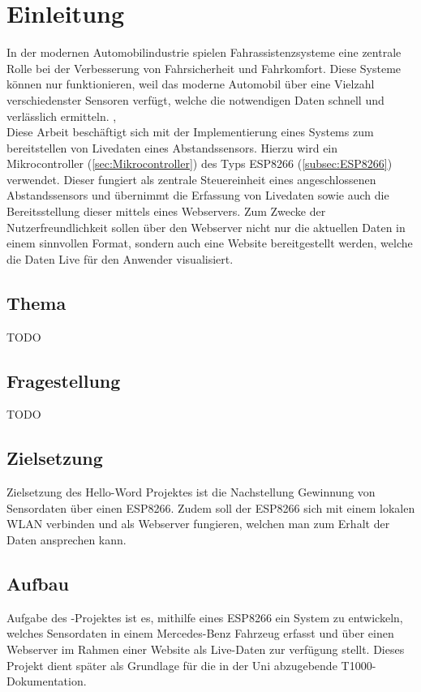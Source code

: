 
\chapter{Einleitung}
In der modernen Automobilindustrie spielen Fahrassistenzsysteme eine zentrale Rolle bei der Verbesserung von Fahrsicherheit und Fahrkomfort. Diese Systeme können nur funktionieren, weil das moderne Automobil über eine Vielzahl verschiedenster Sensoren verfügt, welche die notwendigen Daten schnell und verlässlich ermitteln. \protect{}, \protect{}\\
Diese Arbeit beschäftigt sich mit der Implementierung eines Systems zum bereitstellen von Livedaten eines Abstandssensors. Hierzu wird ein Mikrocontroller (\autoref{sec:Mikrocontroller}) des Typs ESP8266 (\autoref{subsec:ESP8266}) verwendet. Dieser fungiert als zentrale Steuereinheit eines angeschlossenen Abstandssensors und übernimmt die Erfassung von Livedaten sowie auch die Bereitsstellung dieser mittels eines Webservers. Zum Zwecke der Nutzerfreundlichkeit sollen über den Webserver nicht nur die aktuellen Daten in einem sinnvollen Format, sondern auch eine Website bereitgestellt werden, welche die Daten Live für den Anwender visualisiert.  

\section{Thema}
TODO

\section{Fragestellung}
TODO

\section{Zielsetzung}
Zielsetzung des Hello-Word Projektes ist die Nachstellung Gewinnung von Sensordaten über einen ESP8266. Zudem soll der ESP8266 sich mit einem lokalen WLAN verbinden und als Webserver fungieren, welchen man zum Erhalt der Daten ansprechen kann.

\section{Aufbau}
Aufgabe des {\arbeit}-Projektes ist es, mithilfe eines ESP8266 ein System zu entwickeln, welches Sensordaten in einem Mercedes-Benz Fahrzeug erfasst und über einen Webserver im Rahmen einer Website als Live-Daten zur verfügung stellt. Dieses Projekt dient später als Grundlage für die in der Uni abzugebende T1000-Dokumentation.

